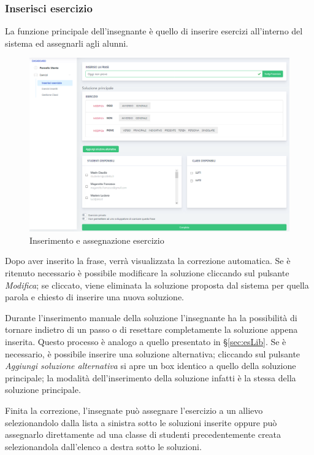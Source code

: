         \subsubsection{Inserisci esercizio}
          La funzione principale dell'insegnante è quello di inserire esercizi all'interno del sistema ed assegnarli agli alunni.
        	\begin{figure}[H]
            	\centering
        		\includegraphics[width=17cm]{sez/img/insegnante/inserisciEsercizio.PNG} 
            	\caption{Inserimento e assegnazione esercizio}\label{fig:1}
        	\end{figure}
        
         
          Dopo aver inserito la frase, verrà visualizzata la correzione automatica. Se è ritenuto necessario è possibile modificare la soluzione cliccando sul pulsante \textit{Modifica}; se cliccato, viene eliminata la soluzione proposta dal sistema per quella parola e chiesto di inserire una nuova soluzione. 
          
          Durante l'inserimento manuale della soluzione l'insegnante ha la possibilità di tornare indietro di un passo o di resettare completamente la soluzione appena inserita. Questo processo è analogo a quello presentato in \S\ref{sec:esLib}. 
          Se è necessario, è possibile inserire una soluzione alternativa; cliccando sul pulsante \textit{Aggiungi soluzione alternativa} si apre un box identico a quello della soluzione principale; la modalità dell'inserimento della soluzione infatti è la stessa della soluzione principale. 
          
           Finita la correzione, l'insegnate può assegnare l'esercizio a un allievo selezionandolo dalla lista a sinistra sotto le soluzioni inserite oppure può assegnarlo direttamente ad una classe di studenti precedentemente creata selezionandola dall'elenco a destra sotto le soluzioni. 
          
